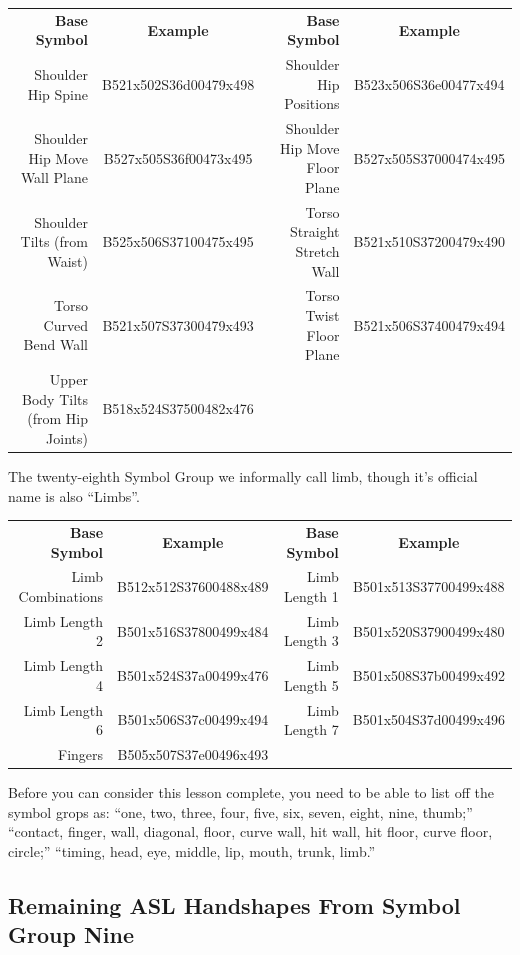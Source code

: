 \documentclass{article}
\begin{document}
\begin{center}
\begin{tabular}{rcrc}
\textbf{Base Symbol}&\textbf{Example}&\textbf{Base Symbol}&\textbf{Example}\\
Shoulder Hip Spine                &B521x502S36d00479x498&Shoulder Hip Positions       &B523x506S36e00477x494\\
Shoulder Hip Move Wall Plane      &B527x505S36f00473x495&Shoulder Hip Move Floor Plane&B527x505S37000474x495\\
Shoulder Tilts (from Waist)       &B525x506S37100475x495&Torso Straight Stretch Wall  &B521x510S37200479x490\\
Torso Curved Bend Wall            &B521x507S37300479x493&Torso Twist Floor Plane      &B521x506S37400479x494\\
Upper Body Tilts (from Hip Joints)&B518x524S37500482x476\\
\end{tabular}
\end{center}

The twenty-eighth Symbol Group we informally call limb, though it's official name is also ``Limbs''.

\begin{center}
\begin{tabular}{rcrc}
\textbf{Base Symbol}&\textbf{Example}&\textbf{Base Symbol}&\textbf{Example}\\
Limb Combinations&B512x512S37600488x489&Limb Length 1&B501x513S37700499x488\\
Limb Length 2    &B501x516S37800499x484&Limb Length 3&B501x520S37900499x480\\
Limb Length 4    &B501x524S37a00499x476&Limb Length 5&B501x508S37b00499x492\\
Limb Length 6    &B501x506S37c00499x494&Limb Length 7&B501x504S37d00499x496\\
Fingers          &B505x507S37e00496x493\\
\end{tabular}
\end{center}

Before you can consider this lesson complete, you need to be able to list off the symbol grops as:
``one, two, three, four, five, six, seven, eight, nine, thumb;''
``contact, finger, wall, diagonal, floor, curve wall, hit wall, hit floor, curve floor, circle;''
``timing, head, eye, middle, lip, mouth, trunk, limb.''

\subsection{Remaining ASL Handshapes From Symbol Group Nine}
\end{document}
